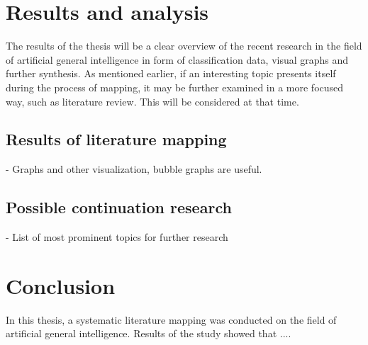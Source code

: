 \documentclass[utf8,english]{gradu3}
\begin{document}
\chapter{Results and analysis}
The results of the thesis will be a clear overview of the recent research in the field of artificial general intelligence in form of classification data, visual graphs and further synthesis. As mentioned earlier, if an interesting topic presents itself during the process of mapping, it may be further examined in a more focused way, such as literature review. This will be considered at that time.

\section{Results of literature mapping}
- Graphs and other visualization, bubble graphs are useful.

\section{Possible continuation research}

- List of most prominent topics for further research

\chapter{Conclusion}
In this thesis, a systematic literature mapping was conducted on the field of artificial general intelligence. Results of the study showed that .... 

\printbibliography
\end{document}
